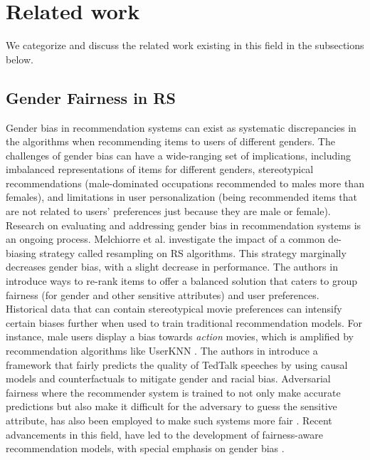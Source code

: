 \section{Related work}
% 
We categorize and discuss the related work existing in this field in the subsections below.
\subsection{Gender Fairness in RS}
Gender bias in recommendation systems can exist as systematic discrepancies in the algorithms when recommending items to users of different genders. The challenges of gender bias can have a wide-ranging set of implications, including imbalanced representations of items for different genders, stereotypical recommendations (male-dominated occupations recommended to males more than females), and limitations in user personalization (being recommended items that are not related to users' preferences just because they are male or female). Research on evaluating and addressing gender bias in recommendation systems is an ongoing process. Melchiorre et al. \cite{Melchiorre21} investigate the impact of a common de-biasing strategy called resampling on RS algorithms. This strategy marginally decreases gender bias, with a slight decrease in performance. The authors in \cite{pmlr-v139-gorantla21a,10.1145/3132847.3132938,XIA2019104857} introduce ways to re-rank items to offer a balanced solution that caters to group fairness (for gender and other sensitive attributes) and user preferences.
Historical data that can contain stereotypical movie preferences can intensify certain biases further when used to train traditional recommendation models. For instance, male users display a bias towards \textit{action} movies, which is amplified by recommendation algorithms like UserKNN \cite{TsintzouPT19}. The authors in \cite{Acharyya_Das_Chattoraj_Tanveer_2020}
introduce a framework that fairly predicts the quality of TedTalk speeches by using causal models and counterfactuals to mitigate gender and racial bias. Adversarial fairness where the recommender system is trained to not only make accurate predictions but also make it difficult for the adversary to guess the sensitive attribute, has also been employed to make such systems more fair \cite{LIU2022108058,rus2022closinggenderwagegap}. Recent advancements in this field, have led to the development of fairness-aware recommendation models, with special emphasis on gender bias \cite{yang2020causalintersectionalityfairranking, boratto2022consumer,10.1145/3397271.3401177,zhu18,wei2022comprehensive,10.1145/3442381.3450015}.
